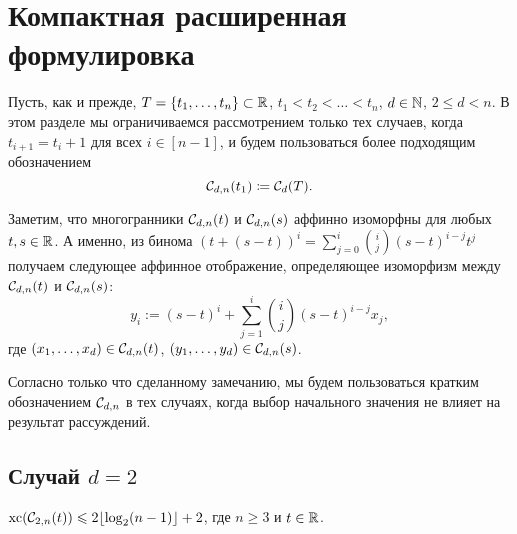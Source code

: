 \section{Компактная расширенная формулировка}
\label{sec:EF4Cyclic}

Пусть, как и прежде, $T = \{t_1, \dots, t_n\} \subset \mathbb{R}$, $t_1 < t_2 < \dots < t_n$, $d \in \mathbb{N}$, $2 \le d < n$.
В этом разделе мы ограничиваемся рассмотрением только тех случаев, когда $t_{i+1} = t_i + 1$ для всех $i\in[n-1]$, и будем пользоваться более подходящим обозначением
\[
{\mathcal C}_{d,n}(t_1) \coloneqq {\mathcal C}_d(T).
\]

Заметим, что многогранники ${\mathcal C}_{d,n}(t)$ и ${\mathcal C}_{d,n}(s)$ аффинно изоморфны для любых $t,s \in \mathbb{R}$. 
А именно, из бинома $(t + (s-t))^i = \sum_{j=0}^i \binom{i}{j} (s-t)^{i-j} t^j$ получаем следующее аффинное отображение, определяющее изоморфизм между ${\mathcal C}_{d,n}(t)$ и ${\mathcal C}_{d,n}(s)$:
\begin{equation}\label{eq:affine_isomorphism} 
y_i:=(s-t)^i+\sum_{j=1}^i \binom{i}{j} (s-t)^{i-j} x_j, 
\end{equation}
где $(x_1,\ldots,x_d) \in {\mathcal C}_{d,n}(t)$, $(y_1,\ldots,y_d) \in {\mathcal C}_{d,n}(s)$.

Согласно только что сделанному замечанию, мы будем пользоваться кратким обозначением ${\mathcal C}_{d,n}$ в тех случаях, когда выбор начального значения не влияет на результат рассуждений.


\subsection{Случай $d=2$}


\begin{lemma}
\label{lem:two_dim}
$\operatorname{xc}({\mathcal C}_{2,n}(t)) \leqslant 2\lfloor \log_2(n-1)\rfloor+2$, где $n \ge 3$ и $t \in \mathbb{R}$.
\end{lemma}

